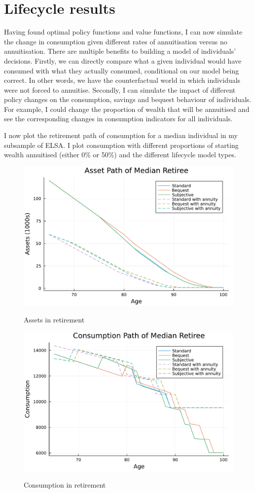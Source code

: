 \documentclass[12pt]{article}
\begin{document}
\section{Lifecycle results}

Having found optimal policy functions and value functions, I can now simulate the
change in consumption given different rates of annuitisation versus no
annuitisation. There are multiple benefits to building a model of individuals'
decisions. Firstly, we can directly compare what a given individual would have
consumed with what they actually consumed, conditional on our model being
correct. In other words, we have the counterfactual world in which individuals
were not forced to annuitise. Secondly, I can simulate the impact of different
policy changes on the consumption, savings and bequest behaviour of individuals.
For example, I could change the proportion of wealth that will be annuitised and
see the corresponding changes in consumption indicators for all individuals.

I now plot the retirement path of consumption for a median individual in my subsample of ELSA.
I plot consumption with different proportions of starting wealth
annuitised (either 0\% or 50\%) and the different lifecycle model types.

\begin{figure}[h]
  \caption{Assets in retirement}
  \centering
  \includegraphics[width=0.7\columnwidth]{figures/asset_plot_median_retiree.pdf}
  \label{fig:AssetPlot}
\end{figure}
\begin{figure}[h]
  \caption{Consumption in retirement}
  \centering
  \includegraphics[width=0.7\columnwidth]{figures/consumption_plot_median_retiree.pdf}
  \label{fig:ConsumpPlot}
\end{figure}
\end{document}
